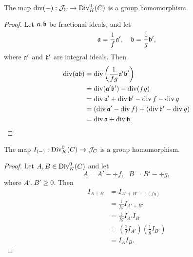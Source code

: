 \begin{proposition}
  The map $\div(-) : \cal J_C \to \Div_K^0(C)$ is a group homomorphism.
\end{proposition}
\begin{proof}
  Let $\frak a, \frak b$  be fractional ideals, and let
  \[ \frak a = \frac 1 f \frak a', ~~~ \frak b = \frac 1 g \frak b', \]
  where $\frak a'$ and $\frak b'$ are integral ideals. Then
  \begin{align*}
    \div(\frak a \frak b)
      &= \div \left( \frac 1 {fg} \frak a' \frak b' \right) \\
      &= \div(\frak a' \frak b') - \div (fg) \\
      &= \div \frak a' + \div \frak b' - \div f - \div g \\
      &= (\div \frak a' - \div f) + (\div \frak b' - \div g) \\
      &= \div \frak a + \div \frak b.
  \end{align*}
\end{proof}
\begin{proposition}
  The map $I_{(-)} : \Div_K^0(C) \to \cal J_C$ is a group homomorphism.
\end{proposition}
\begin{proof}
  Let $A, B \in \Div_K^0(C)$ and let
    \[ A = A' - \div f, ~~~ B = B' - \div g, \] 
  where $A', B' \geq 0$. Then
  \begin{align*}
    I_{A + B}
      &= I_{A' + B' - \div(fg)} \\
      &= \frac 1 {fg} I_{A' + B'} \\
      &= \frac 1 {fg} I_{A'}I_{B'} \\
      &= \left( \frac 1 f I_{A'} \right) \left( \frac 1 g I_{B'} \right) \\
      &= I_A I_B.
  \end{align*}
\end{proof}

